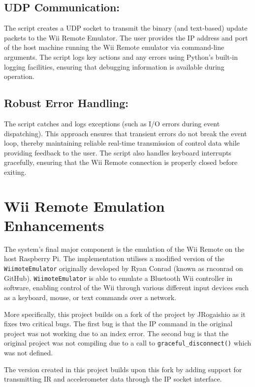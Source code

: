 \subsection{UDP Communication:}
The script creates a UDP socket to transmit the binary (and text-based) update packets to the Wii Remote Emulator. The user provides the IP address and port of the host machine running the Wii Remote emulator via command-line arguments. The script logs key actions and any errors using Python’s built-in logging facilities, ensuring that debugging information is available during operation.

\subsection{Robust Error Handling:}
The script catches and logs exceptions (such as I/O errors during event dispatching). This approach ensures that transient errors do not break the event loop, thereby maintaining reliable real-time transmission of control data while providing feedback to the user. The script also handles keyboard interrupts gracefully, ensuring that the Wii Remote connection is properly closed before exiting.

\section{Wii Remote Emulation Enhancements}

The system’s final major component is the emulation of the Wii Remote on the host
Raspberry Pi. The implementation utilises a modified version of the
\texttt{WiimoteEmulator} originally developed by Ryan
Conrad\cite{wiimote_emulator} (known as rnconrad on GitHub).
\texttt{WiimoteEmulator} is able to emulate a Bluetooth Wii controller in
software, enabling control of the Wii through various different input devices such
as a keyboard, mouse, or text commands over a network.

More specifically, this project builds on a fork of the project by
JRogaishio\cite{jr_wiimote_emu} as it fixes two critical bugs. The first bug is
that the IP command in the original project was not working due to an index
error. The second bug is that the original project was not compiling due to a
call to \texttt{graceful\_disconnect()} which was not defined.

The version created in this project\cite{kf_wiimote_emu} builds upon this fork by adding support for transmitting IR and accelerometer data through the IP socket interface.

